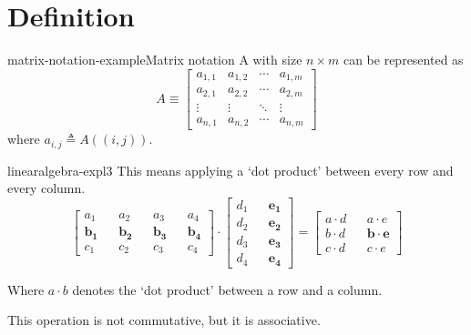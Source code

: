 \documentclass[preview]{standalone}
\begin{document}
\genpage

\section{Definition}


\begin{snippetexample}{matrix-notation-example}{Matrix notation}
    A \matrix with size \(n \times m\) can be represented as
    \[
    A \equiv \begin{bmatrix} 
            a_{1,1} & a_{1,2} & \cdots & a_{1,m} \\
            a_{2,1} & a_{2,2} & \cdots & a_{2,m} \\
            \vdots  & \vdots  & \ddots & \vdots  \\
            a_{n,1} & a_{n,2} & \cdots & a_{n,m} 
        \end{bmatrix}
    \]
    where \(a_{i,j} \triangleq A((i,j))\).
\end{snippetexample}





\begin{snippet}{linearalgebra-expl3}
    This means applying a `dot product' between every row and every column. \\

    \[
        \begin{bmatrix} 
            a_1 && a_2 && a_3 && a_4 \\
            \mathbf{b_1} && \mathbf{b_2} && \mathbf{b_3} && \mathbf{b_4} \\
            c_1 && c_2 && c_3 && c_4
        \end{bmatrix}
        \cdot
        \begin{bmatrix} 
            d_1 && \mathbf{e_1} \\
            d_2 && \mathbf{e_2} \\
            d_3 && \mathbf{e_3} \\
            d_4 && \mathbf{e_4}
        \end{bmatrix}
        =
        \begin{bmatrix} 
            a \cdot d && a \cdot e \\
            b \cdot d && \mathbf{b \cdot e} \\
            c \cdot d && c \cdot e
        \end{bmatrix}
    \]

    Where \(a \cdot b\) denotes the `dot product' between a row and a column.

    This operation is not commutative, but it is associative.
\end{snippet}
\end{document}
